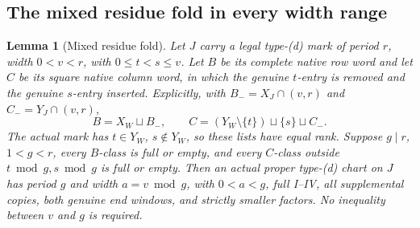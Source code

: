 \documentclass[11pt,a4paper]{amsart}
\numberwithin{equation}{section}
\theoremstyle{plain}
\newtheorem{lemma}[theorem]{Lemma}
\theoremstyle{definition}
\begin{document}
\subsection{The mixed residue fold in every width range}

\begin{lemma}[Mixed residue fold]\label{ge:mixed-fold}
Let \(J\) carry a legal type-(d) mark of period \(r\), width
\(0<v<r\), with \(0\le t<s\le v\).  Let \(B\) be its complete
native row word and let \(C\) be its square native column word, in
which the genuine \(t\)-entry is removed and the genuine \(s\)-entry
inserted.  Explicitly, with \(B_-=X_J\cap(v,r)\) and
\(C_-=Y_J\cap(v,r)\),
\[
 B=X_W\sqcup B_-,\qquad
 C=(Y_W\setminus\{t\})\sqcup\{s\}\sqcup C_-.
\]
The actual mark has \(t\in Y_W\), \(s\notin Y_W\), so these
lists have equal rank.  Suppose \(g\mid r\), \(1<g<r\), every \(B\)-class
is full or empty, and every \(C\)-class outside
\(t\bmod g,s\bmod g\) is full or empty.  Then an actual proper
type-(d) chart on \(J\) has period \(g\) and width
\(a=v\bmod g\), with \(0<a<g\), full I--IV, all supplemental
copies, both genuine end windows, and strictly smaller factors.  No
inequality between \(v\) and \(g\) is required.
\end{lemma}
\end{document}
